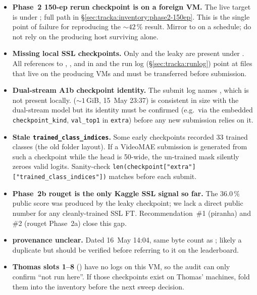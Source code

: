 \begin{itemize}[leftmargin=2em]
\item \textbf{Phase~2 150-ep rerun checkpoint is on a foreign VM.}
   The live target is
    under
   ; full path in
   \S\ref{sec:tracka:inventory:phase2-150ep}.  This is the single point
   of failure for reproducing the \(\sim 42\,\%\) result.  Mirror to
    on a schedule; do not rely on
   the producing host surviving alone.
\item \textbf{Missing local SSL checkpoints.}  Only
    and the leaky  are present
   under .  All references to
   , ,  and
    in  and the run log
   (\S\ref{sec:tracka:runlog}) point at files that live on the producing
   VMs and must be transferred before submission.
\item \textbf{Dual-stream A1b checkpoint identity.}  The submit log
   names ,
   which is not present locally.  
   (\(\sim 1\,\)GiB, 15~May 23:37) is consistent in size with the
   dual-stream model but its identity must be confirmed (e.g.\ via the
   embedded \texttt{checkpoint\_kind}, \texttt{val\_top1} in
   \texttt{extra}) before any new submission relies on it.
\item \textbf{Stale \texttt{trained\_class\_indices}.}  Some early
   checkpoints recorded 33 trained classes (the old folder layout).
   If a VideoMAE submission is generated from such a checkpoint while
   the head is 50-wide, the un-trained mask silently zeroes valid
   logits.  Sanity-check
   \texttt{len(checkpoint["extra"]["trained\_class\_indices"])} matches
    before each submit.
\item \textbf{Phase~2b rouget is the only Kaggle SSL signal so far.}
   The \(36.0\,\%\) public score was produced by the leaky checkpoint;
   we lack a direct public number for any cleanly-trained SSL FT.
   Recommendation~\#1 (piranha) and \#2 (rouget Phase~2a) close this
   gap.
\item \textbf{ provenance unclear.}  Dated
   16~May 14:04, same byte count as
   ; likely a duplicate but
   should be verified before referring to it on the leaderboard.
\item \textbf{Thomas slots 1--8} () have no logs on this
   VM, so the audit can only confirm ``not run here''.  If those
   checkpoints exist on Thomas' machines, fold them into the inventory
   before the next sweep decision.
\end{itemize}
